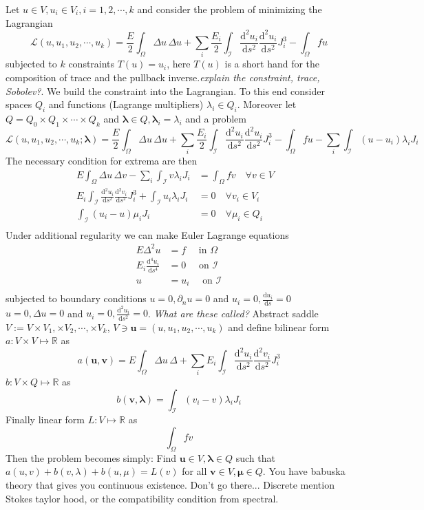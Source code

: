 \documentclass{marine_2015}
\newcommand{\ainner}[2]{\ensuremath{a\left(#1, #2\right)}}
\newcommand{\binner}[2]{\ensuremath{b\left(#1, #2\right)}}
\newcommand{\Linner}[1]{\ensuremath{L\left(#1\right)}}
\newcommand{\vvec}[1]{\ensuremath{\pmb{#1}}}
\newcommand{\deriv}[2]{\ensuremath{\frac{\mathrm{d}#1}{\mathrm{d}#2}}}
\newcommand{\tderiv}[2]{\ensuremath{\tfrac{\mathrm{d}#1}{\mathrm{d}#2}}}
\begin{document}
Let $u\in V, u_i\in V_i, i=1, 2, \cdots, k$ and consider the problem of
minimizing the Lagrangian
\[
  \mathcal{L}\left(u, u_1, u_2, \cdots, u_k\right)=
  \frac{E}{2}\displaystyle\int_{\Omega}\Delta u\,\Delta u+
  \sum_i\frac{E_i}{2}\int_{\mathcal{I}}
  \deriv{^2u_i}{s^2}\deriv{^2u_i}{s^2}J_i^3
  -\displaystyle\int_{\Omega}f u
\]
subjected to $k$ constraints
$T(u)=u_i$, here $T(u)$ is a short hand for the composition of trace and the
pullback inverse.\textit{explain the constraint, trace, Sobolev?}.
We build the constraint into the Lagrangian. To this end consider spaces $Q_i$
and functions (Lagrange multipliers) $\lambda_i\in Q_i$. Moreover let
$Q=Q_0\times Q_1\times\cdots\times Q_k$ and $\vvec{\lambda}\in
Q,\vvec{\lambda}_i=\lambda_i$ and a problem
\[
  \mathcal{L}\left(u, u_1, u_2, \cdots, u_k;\vvec{\lambda}\right)=
   \frac{E}{2}\displaystyle\int_{\Omega}\Delta u\,\Delta u+
  \sum_i\frac{E_i}{2}\int_{\mathcal{I}} \deriv{^2u_i}{s^2}\deriv{^2u_i}{s^2}J_i^3
  -\displaystyle\int_{\Omega}f u - \sum_i\int_{\mathcal{I}}\left(u-u_i\right)\lambda_i J_i
\]
The necessary condition for extrema are then
\[
  \begin{aligned}
    E\displaystyle\int_{\Omega}\Delta u\,\Delta v- \sum_i\int_{\mathcal{I}}v\lambda_i J_i
    &=\displaystyle\int_{\Omega}f v\quad\forall v\in V& \\
  E_i\displaystyle\int_{\mathcal{I}} \deriv{^2u_i}{s^2}\deriv{^2v_i}{s^2}J_i^3 +
  \int_{\mathcal{I}} u_i \lambda_i J_i &= 0\quad\forall v_i\in V_i&\\
  \int_{\mathcal{I}}\left(u_i-u\right)\mu_i J_i &= 0\quad\forall \mu_i\in Q_i&\\
  \end{aligned}
\]
Under additional regularity we can make Euler Lagrange equations
\[
  \begin{aligned}
    E\Delta^2u &= f\quad\text{ in }\Omega\\
    E_i\deriv{^4 u_i}{s^4} &= 0\quad\text{ on }\mathcal{I}\\
    u &= u_i\quad\text{ on }\mathcal{I}\\
  \end{aligned}
\]
subjected to boundary conditions $u=0, \partial_nu=0$ and $u_i=0, \tderiv{u_i}{s}=0$
$u=0, \Delta u=0$ and $u_i=0, \tderiv{^2u_i}{s^2}=0$. \textit{What are these called?}
Abstract saddle $V:=V\times V_1, \times V_2, \cdots, \times V_k$,
$V\ni\vvec{u}=\left(u, u_1, u_2, \cdots, u_k\right)$ and define bilinear form
$a:V\times V\mapsto\mathbb{R}$ as
\[
  \ainner{\vvec{u}}{\vvec{v}} = 
  E\displaystyle\int_{\Omega}\Delta u\,\Delta+
  \sum_iE_i\displaystyle\int_{\mathcal{I}} \deriv{^2u_i}{s^2}\deriv{^2v_i}{s^2}J_i^3
\]
$b:V\times Q\mapsto\mathbb{R}$ as
\[
  \binner{\vvec{v}}{\vvec{\lambda}} = 
  \int_{\mathcal{I}}\left(v_i-v\right)\lambda_i J_i
\]
Finally linear form
$L:V\mapsto\mathbb{R}$ as
\[
  \displaystyle\int_{\Omega}f v
\]
Then the problem becomes simply: Find $\vvec{u}\in V, \vvec{\lambda}\in Q$ such
that $\ainner{u}{v}+\binner{v}{\lambda}+\binner{u}{\mu}=\Linner{v}$ for all 
$\vvec{v}\in V, \vvec{\mu}\in Q$. You have babuska theory that gives you
continuous existence. Don't go there... Discrete mention Stokes taylor hood, or
the compatibility condition from spectral.




\end{document}
